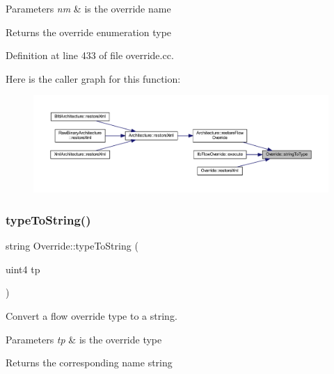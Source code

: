 \begin{DoxyParams}{Parameters}
{\em nm} & is the override name \\
\hline
\end{DoxyParams}
\begin{DoxyReturn}{Returns}
the override enumeration type 
\end{DoxyReturn}


Definition at line 433 of file override.\+cc.

Here is the caller graph for this function\+:
\nopagebreak
\begin{figure}[H]
\begin{center}
\leavevmode
\includegraphics[width=350pt]{class_override_a7456d7f93fb0f67cdebb42ac1bca5c46_icgraph}
\end{center}
\end{figure}
\mbox{\label{class_override_a33a4d3c7956892c27e2ab851c04bd6b7}} 
\subsubsection{\texorpdfstring{typeToString()}{typeToString()}}
{\footnotesize\ttfamily string Override\+::type\+To\+String (\begin{DoxyParamCaption}\item[{uint4}]{tp }\end{DoxyParamCaption})\hspace{0.3cm}{\ttfamily [static]}}



Convert a flow override type to a string. 


\begin{DoxyParams}{Parameters}
{\em tp} & is the override type \\
\hline
\end{DoxyParams}
\begin{DoxyReturn}{Returns}
the corresponding name string 
\end{DoxyReturn}


